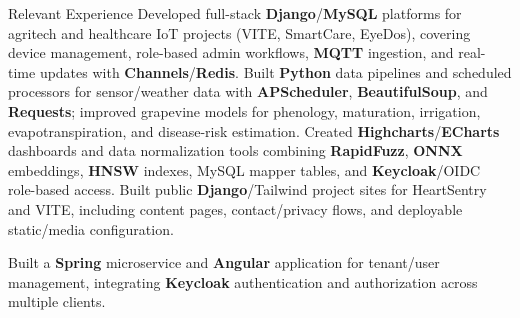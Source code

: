 \begin{rubric}{Relevant Experience}
\entry*%
 Developed full-stack \textbf{Django}/\textbf{MySQL} platforms for agritech and healthcare IoT projects (VITE, SmartCare, EyeDos), covering device management, role-based admin workflows, \textbf{MQTT} ingestion, and real-time updates with \textbf{Channels}/\textbf{Redis}.
\entry*%
 Built \textbf{Python} data pipelines and scheduled processors for sensor/weather data with \textbf{APScheduler}, \textbf{BeautifulSoup}, and \textbf{Requests}; improved grapevine models for phenology, maturation, irrigation, evapotranspiration, and disease-risk estimation.
\entry*%
 Created \textbf{Highcharts}/\textbf{ECharts} dashboards and data normalization tools combining \textbf{RapidFuzz}, \textbf{ONNX} embeddings, \textbf{HNSW} indexes, MySQL mapper tables, and \textbf{Keycloak}/OIDC role-based access.
\entry*%
 Built public \textbf{Django}/Tailwind project sites for HeartSentry and VITE, including content pages, contact/privacy flows, and deployable static/media configuration.

%
\entry*%
 Built a \textbf{Spring} microservice and \textbf{Angular} application for tenant/user management, integrating \textbf{Keycloak} authentication and authorization across multiple clients.
%
\end{rubric}
